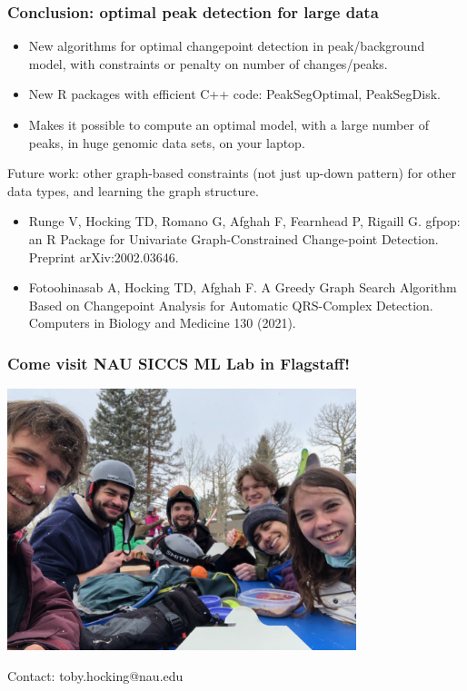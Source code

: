\documentclass[t]{beamer}
\begin{document}
\begin{frame}[fragile]
  \frametitle{Conclusion: optimal peak detection for large data}

  \begin{itemize}
  \item New algorithms for optimal changepoint detection in
    peak/background model, with constraints or penalty on number of
    changes/peaks.
  \item New R packages with efficient C++ code: PeakSegOptimal,
    PeakSegDisk.
  \item Makes it possible to compute an optimal model, with a large
    number of peaks, in huge genomic data sets, on your laptop.
\end{itemize}
Future work: other graph-based constraints (not just up-down pattern)
for other data types, and learning the graph structure.
\begin{itemize}
  \item Runge V, Hocking TD, Romano G, Afghah F, Fearnhead P, Rigaill G. gfpop: an R Package for Univariate Graph-Constrained Change-point Detection. Preprint arXiv:2002.03646.
  \item Fotoohinasab A, Hocking TD, Afghah F. A Greedy Graph Search
    Algorithm Based on Changepoint Analysis for Automatic QRS-Complex
    Detection. Computers in Biology and Medicine 130 (2021).
  \end{itemize}
  
\end{frame}

\begin{frame}
  \frametitle{Come visit NAU SICCS ML Lab in Flagstaff!}

  \includegraphics[height=3in]{2021-03-lab-ski-lunch} 

  Contact: toby.hocking@nau.edu

\end{frame} 
\end{document}
